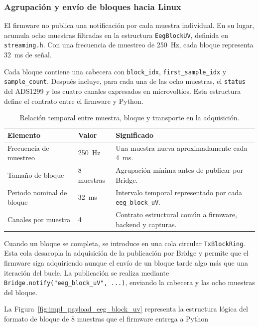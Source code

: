 \documentclass[../main.tex]{subfiles}
\begin{document}
\subsubsection{Agrupación y envío de bloques hacia Linux}

El firmware no publica una notificación por cada muestra individual. En su lugar, acumula ocho muestras filtradas en la estructura \texttt{EegBlockUV}, definida en \texttt{streaming.h}. Con una frecuencia de muestreo de \SI{250}{\hertz}, cada bloque representa \SI{32}{\milli\second} de señal.

Cada bloque contiene una cabecera con \texttt{block\_idx}, \texttt{first\_sample\_idx} y \texttt{sample\_count}. Después incluye, para cada una de las ocho muestras, el \texttt{status} del ADS1299 y los cuatro canales expresados en microvoltios. Esta estructura define el contrato entre el firmware y Python.

\begin{table}[H]
    \centering
    \caption{Relación temporal entre muestra, bloque y transporte en la adquisición.}
    \label{tab:impl_tiempos_adquisicion}
    \begin{tabular}{p{}p{}p{}}
        \hline
        \textbf{Elemento} & \textbf{Valor} & \textbf{Significado} \\
        \hline
        Frecuencia de muestreo & \SI{250}{\hertz} & Una muestra nueva aproximadamente cada \SI{4}{\milli\second}. \\
        Tamaño de bloque & 8 muestras & Agrupación mínima antes de publicar por Bridge. \\
        Periodo nominal de bloque & \SI{32}{\milli\second} & Intervalo temporal representado por cada \texttt{eeg\_block\_uV}. \\
        Canales por muestra & 4 & Contrato estructural común a firmware, backend y capturas. \\
        \hline
    \end{tabular}
\end{table}

Cuando un bloque se completa, se introduce en una cola circular \texttt{TxBlockRing}. Esta cola desacopla la adquisición de la publicación por Bridge y permite que el firmware siga adquiriendo aunque el envío de un bloque tarde algo más que una iteración del bucle. La publicación se realiza mediante \texttt{Bridge.notify("eeg\_block\_uV", ...)}, enviando la cabecera y las ocho muestras del bloque.

La Figura~\ref{fig:impl_payload_eeg_block_uv} representa la estructura lógica del formato de bloque de 8 muestras que el firmware entrega a Python
\end{document}

